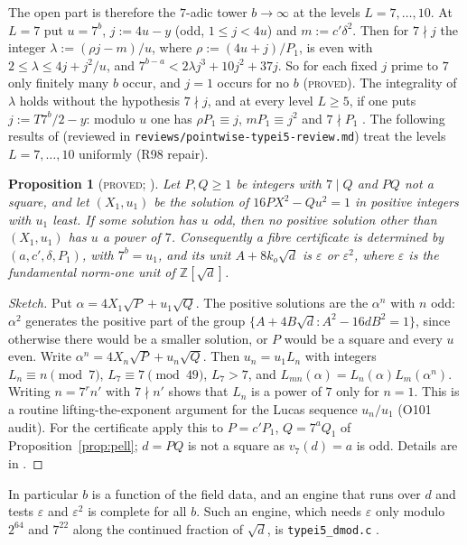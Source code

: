 \documentclass[11pt,reqno]{amsart}
\newtheorem{proposition}[theorem]{Proposition}
\theoremstyle{definition}
\newcommand{\Z}{\mathbb Z}
\newcommand{\status}[1]{\textup{\textsc{#1}}}
\begin{document}
The open part is therefore the $7$-adic tower $b\to\infty$ at the levels
$L=7,\dots,10$.  At $L=7$ put $u=7^b$, $j:=4u-y$ (odd, $1\le j<4u$) and
$m:=c'\delta^2$.  Then for $7\nmid j$ the integer $\lambda:=(\rho j-m)/u$,
where $\rho:=(4u+j)/P_1$, is even with $2\le\lambda\le4j+j^2/u$, and
$7^{b-a}<2\lambda j^3+10j^2+37j$.  So for each fixed $j$ prime to $7$
only finitely many $b$ occur, and $j=1$ occurs for no $b$
\cite[Lemma~3.6]{PT4} (\status{proved}).  The integrality of $\lambda$
holds without the hypothesis $7\nmid j$, and at every level $L\ge5$, if
one puts $j:=T7^b/2-y$: modulo $u$ one has $\rho P_1\equiv j$,
$mP_1\equiv j^2$ and $7\nmid P_1$ \cite[Lemma~3.1]{PT5}.  The following
results of \cite{PT5} (reviewed in
\texttt{reviews/pointwise-typei5-review.md}) treat the levels
$L=7,\dots,10$ uniformly (R98 repair).

\begin{proposition}[\status{proved}; {\cite[Lemma~1.1, Cor.~1.2]{PT5}}]\label{prop:minunit}
Let $P,Q\ge1$ be integers with $7\mid Q$ and $PQ$ not a square, and let
$(X_1,u_1)$ be the solution of $16PX^2-Qu^2=1$ in positive integers with
$u_1$ least.  If some solution has $u$ odd, then no positive solution
other than $(X_1,u_1)$ has $u$ a power of $7$.  Consequently a fibre
certificate is determined by $(a,c',\delta,P_1)$, with $7^b=u_1$, and its
unit $A+8k_o\sqrt d$ is $\varepsilon$ or $\varepsilon^2$, where
$\varepsilon$ is the fundamental norm-one unit of $\Z[\sqrt d]$.
\end{proposition}

\begin{proof}[Sketch]
Put $\alpha=4X_1\sqrt P+u_1\sqrt Q$.  The positive solutions are the
$\alpha^n$ with $n$ odd: $\alpha^2$ generates the positive part of the
group $\{A+4B\sqrt d:A^2-16dB^2=1\}$, since otherwise there would be a
smaller solution, or $P$ would be a square and every $u$ even.  Write
$\alpha^n=4X_n\sqrt P+u_n\sqrt Q$.  Then $u_n=u_1L_n$ with integers
$L_n\equiv n\pmod7$, $L_7\equiv7\pmod{49}$, $L_7>7$, and
$L_{mn}(\alpha)=L_n(\alpha)L_m(\alpha^n)$.  Writing $n=7^rn'$ with
$7\nmid n'$ shows that $L_n$ is a power of $7$ only for $n=1$.  This is
a routine lifting-the-exponent argument for the Lucas sequence $u_n/u_1$
(O101 audit).  For the
certificate apply this to $P=c'P_1$, $Q=7^aQ_1$ of
Proposition~\ref{prop:pell}; $d=PQ$ is not a square as $v_7(d)=a$ is
odd.  Details are in \cite[\S1]{PT5}.
\end{proof}

In particular $b$ is a function of the field data, and an engine that
runs over $d$ and tests $\varepsilon$ and $\varepsilon^2$ is complete for
all $b$.  Such an engine, which needs $\varepsilon$ only modulo $2^{64}$
and $7^{22}$ along the continued fraction of $\sqrt d$, is
\texttt{typei5\_dmod.c} \cite[\S2]{PT5}.
\end{document}
